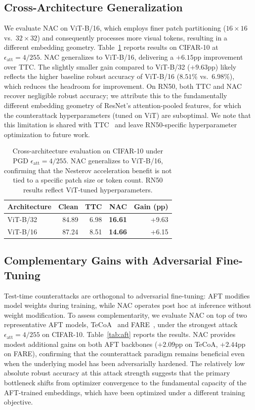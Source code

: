 \documentclass[12pt,a4paper]{article}
\begin{document}
\subsection{Cross-Architecture Generalization}

We evaluate NAC on ViT-B/16, which employs finer patch partitioning ($16\times16$ vs.\ $32\times32$) and consequently processes more visual tokens, resulting in a different embedding geometry. Table~\ref{tab:cross} reports results on CIFAR-10 at $\epsilon_{\text{att}}=4/255$. NAC generalizes to ViT-B/16, delivering a $+6.15$pp improvement over TTC. The slightly smaller gain compared to ViT-B/32 ($+9.63$pp) likely reflects the higher baseline robust accuracy of ViT-B/16 ($8.51\%$ vs.\ $6.98\%$), which reduces the headroom for improvement. On RN50, both TTC and NAC recover negligible robust accuracy; we attribute this to the fundamentally different embedding geometry of ResNet's attention-pooled features, for which the counterattack hyperparameters (tuned on ViT) are suboptimal. We note that this limitation is shared with TTC~\cite{xing2025clip} and leave RN50-specific hyperparameter optimization to future work.

\begin{table}[ht]\centering\small
\caption{Cross-architecture evaluation on CIFAR-10 under PGD $\epsilon_{\text{att}}=4/255$. NAC generalizes to ViT-B/16, confirming that the Nesterov acceleration benefit is not tied to a specific patch size or token count. RN50 results reflect ViT-tuned hyperparameters.}\label{tab:cross}
\begin{tabular}{@{}lrrrr@{}}
\toprule Architecture & Clean & TTC & NAC & Gain (pp) \\
\midrule ViT-B/32 & 84.89 & 6.98 & \textbf{16.61} & +9.63 \\
ViT-B/16 & 87.24 & 8.51 & \textbf{14.66} & +6.15 \\
\bottomrule
\end{tabular}
\end{table}

\subsection{Complementary Gains with Adversarial Fine-Tuning}

Test-time counterattacks are orthogonal to adversarial fine-tuning: AFT modifies model weights during training, while NAC operates post hoc at inference without weight modification. To assess complementarity, we evaluate NAC on top of two representative AFT models, TeCoA~\cite{mao2023understanding} and FARE~\cite{schlarmann2024robust}, under the strongest attack $\epsilon_{\text{att}}=4/255$ on CIFAR-10. Table~\ref{tab:aft} reports the results. NAC provides modest additional gains on both AFT backbones ($+2.09$pp on TeCoA, $+2.44$pp on FARE), confirming that the counterattack paradigm remains beneficial even when the underlying model has been adversarially hardened. The relatively low absolute robust accuracy at this attack strength suggests that the primary bottleneck shifts from optimizer convergence to the fundamental capacity of the AFT-trained embeddings, which have been optimized under a different training objective.
\end{document}
